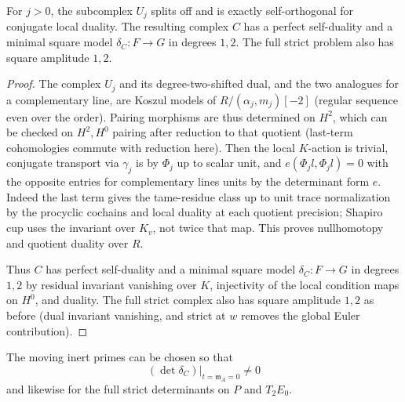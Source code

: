 \begin{lemma}\label{real:local-conditions}
For \(j>0\), the subcomplex \(U_j\) splits off and is exactly
self-orthogonal for conjugate local duality. The resulting complex
\(C\) has a perfect self-duality and a minimal square model
\(\delta_C:F\to G\) in degrees \(1,2\). The full strict problem also
has square amplitude \(1,2\).
\end{lemma}

\begin{proof}
The complex \(U_j\) and its degree-two-shifted dual, and the two analogues for a complementary line, are Koszul models of \(R/(\alpha_j,m_j)[-2]\) (regular sequence even over the order). Pairing morphisms are thus determined on \(H^2\), which can be checked on \(H^2,H^0\) pairing after reduction to that quotient (last-term cohomologies commute with reduction here). Then the local \(K\)-action is trivial, conjugate transport via \(\gamma_j\) is by \(\Phi_j\) up to scalar unit, and \(e(\Phi_j l,\Phi_j l)=0\) with the opposite entries for complementary lines units by the determinant form \(e\). Indeed the last term gives the tame-residue class up to unit trace normalization by the procyclic cochains and local duality at each quotient precision; Shapiro cup uses the invariant over \(K_v\), not twice that map. This proves nullhomotopy and quotient duality over \(R\).

Thus \(C\) has perfect self-duality and a minimal square model \(\delta_C:F\to G\) in degrees \(1,2\) by residual invariant vanishing over \(K\), injectivity of the local condition maps on \(H^0\), and duality. The full strict complex also has square amplitude \(1,2\) as before (dual invariant vanishing, and strict at \(w\) removes the global Euler contribution).
\end{proof}

\begin{proposition}\label{real:transversality}
The moving inert primes can be chosen so that
\[
                   (\det\delta_C)|_{t=\mathfrak m_A=0}\ne0             \tag{R1}\label{eq:R1}
\]
and likewise for the full strict determinants on \(P\) and \(T_2E_0\).
\end{proposition}

